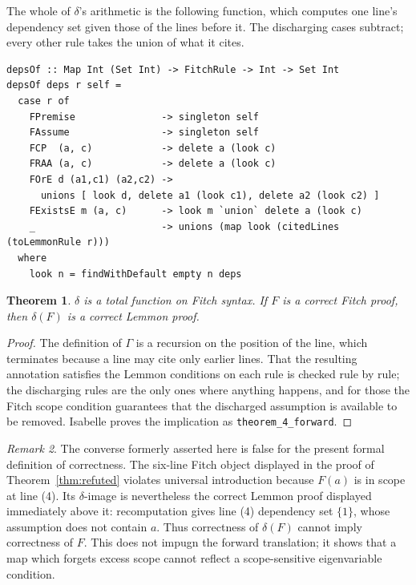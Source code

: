 \documentclass[11pt]{article}
\theoremstyle{plain}
\newtheorem{theorem}{Theorem}
\theoremstyle{definition}
\theoremstyle{remark}
\newtheorem{remark}[theorem]{Remark}
\begin{document}
The whole of $\delta$'s arithmetic is the following function, which computes
one line's dependency set given those of the lines before it. The
discharging cases subtract; every other rule takes the union of what it cites.

\begin{lstlisting}
depsOf :: Map Int (Set Int) -> FitchRule -> Int -> Set Int
depsOf deps r self =
  case r of
    FPremise               -> singleton self
    FAssume                -> singleton self
    FCP  (a, c)            -> delete a (look c)
    FRAA (a, c)            -> delete a (look c)
    FOrE d (a1,c1) (a2,c2) ->
      unions [ look d, delete a1 (look c1), delete a2 (look c2) ]
    FExistsE m (a, c)      -> look m `union` delete a (look c)
    _                      -> unions (map look (citedLines (toLemmonRule r)))
  where
    look n = findWithDefault empty n deps
\end{lstlisting}

\begin{theorem}\label{thm:total}
$\delta$ is a total function on Fitch syntax. If $F$ is a correct Fitch proof,
then $\delta(F)$ is a correct Lemmon proof.
\end{theorem}

\begin{proof}
The definition of $\Gamma$ is a recursion on the position of the line, which
terminates because a line may cite only earlier lines. That the resulting
annotation satisfies the Lemmon conditions on each rule is checked rule by
rule; the discharging rules are the only ones where anything happens, and for
those the Fitch scope condition guarantees that the discharged assumption is
available to be removed.  Isabelle proves the implication as
\verb|theorem_4_forward|.
\end{proof}

\begin{remark}\label{rem:theorem4-converse}
The converse formerly asserted here is false for the present formal definition
of correctness. The six-line Fitch object displayed in the proof of
Theorem~\ref{thm:refuted} violates universal introduction because $F(a)$ is in
scope at line (4). Its $\delta$-image is nevertheless the correct Lemmon proof
displayed immediately above it: recomputation gives line (4) dependency set
$\{1\}$, whose assumption does not contain $a$. Thus correctness of
$\delta(F)$ cannot imply correctness of $F$. This does not impugn the forward
translation; it shows that a map which forgets excess scope cannot reflect a
scope-sensitive eigenvariable condition.
\end{remark}
\end{document}
